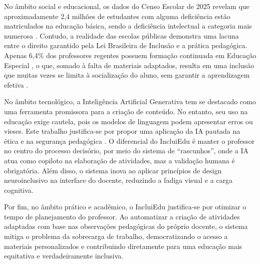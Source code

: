 No âmbito social e educacional, os dados do Censo Escolar de 2025 revelam que aproximadamente 2,4 milhões de estudantes com alguma deficiência estão matriculados na educação básica, sendo a deficiência intelectual a categoria mais numerosa \cite{inep2025censo}. Contudo, a realidade das escolas públicas demonstra uma lacuna entre o direito garantido pela Lei Brasileira de Inclusão \cite{brasil2015lbi} e a prática pedagógica. Apenas 6,4\% dos professores regentes possuem formação continuada em Educação Especial \cite{irm2026panorama}, o que, somado à falta de materiais adaptados, resulta em uma inclusão que muitas vezes se limita à socialização do aluno, sem garantir a aprendizagem efetiva \cite{oliveira2025escolas}. 

No âmbito tecnológico, a Inteligência Artificial Generativa tem se destacado como uma ferramenta promissora para a criação de conteúdo. No entanto, seu uso na educação exige cautela, pois os modelos de linguagem podem apresentar erros ou vieses. Este trabalho justifica-se por propor uma aplicação da IA pautada na ética e na segurança pedagógica \cite{engaja2026}. O diferencial do IncluiEdu é manter o professor no centro do processo decisório, por meio do sistema de ``rascunhos'', onde a IA atua como copiloto na elaboração de atividades, mas a validação humana é obrigatória. Além disso, o sistema inova ao aplicar princípios de design neuroinclusivo \cite{bertoletti2026light,kozybayev2026cognitive} na interface do docente, reduzindo a fadiga visual e a carga cognitiva.

Por fim, no âmbito prático e acadêmico, o IncluiEdu justifica-se por otimizar o tempo de planejamento do professor. Ao automatizar a criação de atividades adaptadas com base nas observações pedagógicas do próprio docente, o sistema mitiga o problema da sobrecarga de trabalho, democratizando o acesso a materiais personalizados e contribuindo diretamente para uma educação mais equitativa e verdadeiramente inclusiva.
